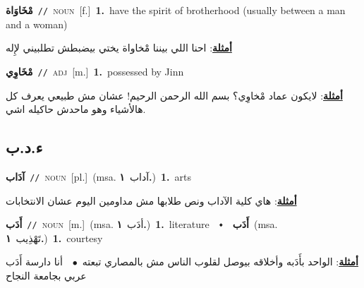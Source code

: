 \documentclass[10pt,a4paper,twoside]{article} %
\begin{document}
\begin{multicols}{2}
{\setlength\topsep{0pt}\textbf{\foreignlanguage{arabic}{مْخَاوَاة}}\ {\color{gray}\texttt{//}\color{black}}\ \textsc{noun}\ [f.]\ \textbf{1.}~have the spirit of brotherhood (usually between a man and a woman)\  \begin{flushright}\color{gray}\foreignlanguage{arabic}{\textbf{\underline{\foreignlanguage{arabic}{أمثلة}}}: احنا اللي بيننا مْخاواة يختي بيضبطش تطلبيني لإِله}\end{flushright}\color{black}} \vspace{2mm}

{\setlength\topsep{0pt}\textbf{\foreignlanguage{arabic}{مْخَاوِي}}\ {\color{gray}\texttt{//}\color{black}}\ \textsc{adj}\ [m.]\ \textbf{1.}~possessed by Jinn\  \begin{flushright}\color{gray}\foreignlanguage{arabic}{\textbf{\underline{\foreignlanguage{arabic}{أمثلة}}}: لايكون عماد مْخاوِي؟ بسم الله الرحمن الرحيم! عشان مش طبيعي يعرف كل هالأشياء وهو ماحدش حاكيله اشي.}\end{flushright}\color{black}} \vspace{2mm}

\vspace{-3mm}
\subsection*{\color{blue}\foreignlanguage{arabic}{ء.د.ب}\color{blue}{}} 

{\setlength\topsep{0pt}\textbf{\foreignlanguage{arabic}{آدَاب}}\ {\color{gray}\texttt{//}\color{black}}\ \textsc{noun}\ [pl.]\ \color{gray}(msa. \foreignlanguage{arabic}{آداب}~\foreignlanguage{arabic}{\textbf{١.}})\color{black}\ \textbf{1.}~arts\  \begin{flushright}\color{gray}\foreignlanguage{arabic}{\textbf{\underline{\foreignlanguage{arabic}{أمثلة}}}: هاي كلية الآداب ونص طلابها مش مداومين اليوم عشان الانتخابات}\end{flushright}\color{black}} \vspace{2mm}

{\setlength\topsep{0pt}\textbf{\foreignlanguage{arabic}{أَدَب}}\ {\color{gray}\texttt{//}\color{black}}\ \textsc{noun}\ [m.]\ \color{gray}(msa. \foreignlanguage{arabic}{أدَب}~\foreignlanguage{arabic}{\textbf{١.}})\color{black}\ \textbf{1.}~literature\ \ $\smblkdiamond$\ \ \setlength\topsep{0pt}\textbf{\foreignlanguage{arabic}{أَدَب}}\ \color{gray}(msa. \foreignlanguage{arabic}{تَهْذِيب}~\foreignlanguage{arabic}{\textbf{١.}})\color{black}\ \textbf{1.}~courtesy\  \begin{flushright}\color{gray}\foreignlanguage{arabic}{\textbf{\underline{\foreignlanguage{arabic}{أمثلة}}}: الواحد بأَدَبه وأخلاقه بيوصل لقلوب الناس مش بالمصاري تبعته\ $\bullet$\ \  أنا دارسة أَدَب عربي بجامعة النجاح}\end{flushright}\color{black}} \vspace{2mm}


\end{multicols}
\end{document}
